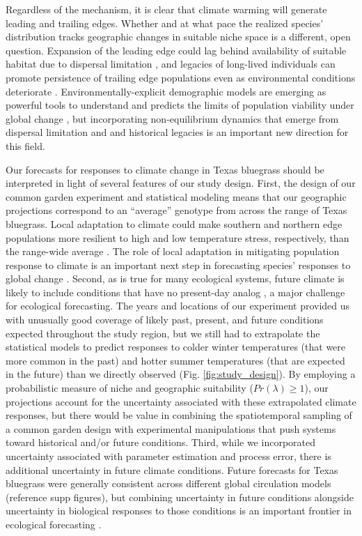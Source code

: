 \documentclass[12pt]{article}\usepackage[]{graphicx}\usepackage[dvipsnames]{xcolor}
\begin{document}
Regardless of the mechanism, it is clear that climate warming will generate leading and trailing edges. 
Whether and at what pace the realized species' distribution tracks geographic changes in suitable niche space is a different, open question. 
Expansion of the leading edge could lag behind availability of suitable habitat due to dispersal limitation \citep{pagel2020mismatches}, and legacies of long-lived individuals can promote persistence of trailing edge populations even as environmental conditions deteriorate \citep{margaret2023trailing}. 
Environmentally-explicit demographic models are emerging as powerful tools to understand and predicts the limits of population viability under global change \citep{schultz2022climate, merow2017climate}, but incorporating  non-equilibrium dynamics that emerge from dispersal limitation and and historical legacies is an important new direction for this field.

Our forecasts for responses to climate change in Texas bluegrass should be interpreted in light of several features of our study design. 
First, the design of our common garden experiment and statistical modeling means that our geographic projections correspond to an ``average'' genotype from across the range of Texas bluegrass. 
Local adaptation to climate could make southern and northern edge populations more resilient to high and low temperature stress, respectively, than the range-wide average \citep{angert2020we,gilbert2017local}. 
The role of local adaptation in mitigating population response to climate is an important next step in forecasting species' responses to global change .
Second, as is true for many ecological systems, future climate is likely to include conditions that have no present-day analog \citep{intergovernmental_panel_on_climate_change_ipcc_climate_2023}, a major challenge for ecological forecasting. 
The years and locations of our experiment provided us with unusually good coverage of likely past, present, and future conditions expected throughout the study region, but we still had to extrapolate the statistical models to predict responses to colder winter temperatures (that were more common in the past) and hotter summer temperatures (that are expected in the future) than we directly observed (Fig. \ref{fig:study_design}). 
By employing a probabilistic measure of niche and geographic suitability ($Pr(\lambda)\ge1$), our projections account for the uncertainty associated with these extrapolated climate responses, but there would be value in combining the spatiotemporal sampling of a common garden design with experimental manipulations that push systems toward historical and/or future conditions. 
Third, while we incorporated uncertainty associated with parameter estimation and process error, there is additional uncertainty in future climate conditions. 
Future forecasts for Texas bluegrass were generally consistent across different global circulation models (reference supp figures), but combining uncertainty in future conditions alongside uncertainty in biological responses to those conditions is an important frontier in ecological forecasting \citep{dietze2018iterative}. 
\end{document}
